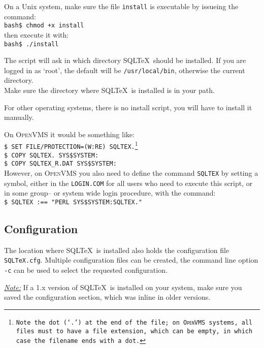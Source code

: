 \documentclass{article}
\newcommand{\vs}{\vspace{3mm}}
\begin{document}
\vs

On a Unix system, make sure the file \texttt{install} is executable by issueing
the command:\\
\texttt{bash\$ chmod +x install}\\
then execute it with:\\
\texttt{bash\$ ./install}

The script will ask in which directory SQL\TeX\ should be installed. If you are
logged in as `root', the default will be \texttt{/usr/local/bin}, otherwise the
current directory.\\
Make sure the directory where SQL\TeX\ is installed is in your path.

\vs

For other operating systems, there is no install script, you will have to install
it manually.

On \textsc{OpenVMS} it would be something like:\\
\texttt{\$ SET FILE/PROTECTION=(W:RE) SQLTEX.\footnote{Note the dot (`.') at the end of the file; on
\textsc{OpenVMS} systems, all files must to have a file extension, which can
be empty, in which case the filename ends with a dot.}\\
\$ COPY SQLTEX. SYS\$SYSTEM:\\
\$ COPY SQLTEX\_R.DAT SYS\$SYSTEM:}\\
However, on \textsc{OpenVMS} you also need to define the command \texttt{SQLTEX} by setting a symbol,
either in the \texttt{LOGIN.COM} for all users who need to execute this script, or in some group-- or
system wide login procedure, with the command:  \\
\texttt{\$ SQLTEX :== "PERL SYS\$SYSTEM:SQLTEX."} 

\subsection{Configuration}\label{config}

The location where SQL\TeX\ is installed also holds the configuration file \texttt{SQLTeX.cfg}.
Multiple configuration files can be created, the command line option \texttt{-c} can be used to
select the requested configuration.

\vs

\noindent\hspace{-3mm}\textit{\underline{Note:}} If a 1.x version of SQL\TeX\ is installed on your system,
make sure you saved the configuration section, which was inline in older versions.
\end{document}
